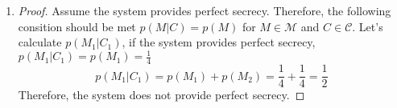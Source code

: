 \documentclass[11pt]{article}
\newcommand{\M}{\mathcal{M}}
\newcommand{\C}{\mathcal{C}}
\newcommand{\logbin}{\log_2}
\theoremstyle{definition}
\begin{document}
\begin{enumerate}
\begin{proof}
\begin{equation*}
\begin{aligned}
        & \sum_{C \in \C}p(C) = 1
      \end{aligned}
      \end{equation*}
      Therefore, as shown above $\sum_{C \in \C}p(C) = 1$. Using that, we can now show that $H(\M|\C) = H(\M)$:
      \begin{equation*}
      \begin{aligned}
        H(\M|\C) &= \sum_{C \in \C}p(C)\sum_{M \in \M}p(M|C)\logbin (\frac{1}{p(M|C)}) \\
                   &= \sum_{M \in \M}p(M|C)\logbin (\frac{1}{p(M|C)}) \\
                   &= H(\M)
      \end{aligned}
      \end{equation*}
    \end{proof}
  \item
    \begin{proof}
      Assume the system provides perfect secrecy. Therefore, the following consition should be met $p(M|C) = p(M)$ for $M \in \M$ and $C \in \C$. Let's calculate $p(M_1|C_1)$, if the system provides perfect secrecy, $p(M_1|C_1) = p(M_1) = \frac{1}{4}$
      \[
        p(M_1|C_1) = p(M_1) + p(M_2) = \frac{1}{4} + \frac{1}{4} = \frac{1}{2}
      \]
      Therefore, the system does not provide perfect secrecy.
    \end{proof}
\end{enumerate}
\end{document}
